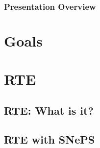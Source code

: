 \documentclass{beamer}
\title{\snalps}
\author{Andy, Yana, Roelant, Mike, \& Paul}
\newcommand{\rte}{{RTE}}
\newcommand{\sneps}{{SN}e{PS}}
\begin{document}

\begin{frame}
	\thispagestyle{empty}
	
 	\titlepage
\end{frame}

\begin{frame}
	\thispagestyle{empty}
	\frametitle{Presentation Overview}

	\tableofcontents
\end{frame}

\section{Goals}


\section{\rte}

\subsection{\rte:  What is it?}



\subsection{{\rte} with {\sneps}}
\end{document}
